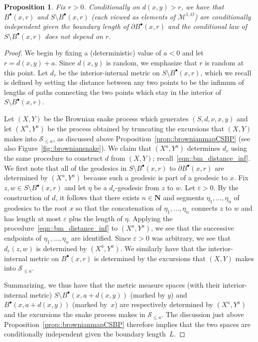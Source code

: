 \documentclass[10pt]{amsart}
\let\mathcal\mathscr
\newcommand{\sbullet}{{\scriptscriptstyle\bullet}}
\let\epsilon\varepsilon
\theoremstyle{plain}
\numberwithin{theorem}{section}
\newtheorem{proposition}[theorem]{Proposition}
\theoremstyle{definition}
\newcommand{\snake}{{\mathcal S}}
\newcommand\mmspace{{\mathcal M}}
\newcommand{\N}{\mathbf{N}}
\newcommand{\fb}[2]{B^\sbullet(#1,#2)}
\begin{document}
\begin{proposition}
\label{prop::metric_net_law}
Fix $r > 0$. Conditionally on $d(x,y) > r$, we have that $\fb{x}{r}$ and $S \setminus \fb{x}{r}$ (each viewed as elements of $\mmspace^{1,O}$) are conditionally independent given the boundary length of $\partial \fb{x}{r}$ and the conditional law of $S \setminus \fb{x}{r}$ does not depend on $r$.
\end{proposition}
\begin{proof}
We begin by fixing a (deterministic) value of $a < 0$ and let $r = d(x,y)+a$. Since $d(x,y)$ is random, we emphasize that $r$ is random at this point. Let $d_r$ be the interior-internal metric on $S \setminus \fb{x}{r}$, which we recall is defined by setting the distance between any two points to be the infimum of lengths of paths connecting the two points which stay in the interior of $S \setminus \fb{x}{r}$.

Let $(X,Y)$ be the Brownian snake process which generates $(S,d,\nu,x,y)$ and let $(X^a,Y^a)$ be the process obtained by truncating the excursions that $(X,Y)$ makes into $\snake_{\leq a}$, as discussed above Proposition~\ref{prop::brownianmapCSBP} (see also Figure~\ref{fig::browniansnake}). We claim that $(X^a,Y^a)$ determines $d_r$ using the same procedure to construct $d$ from $(X,Y)$; recall~\eqref{eqn::bm_distance_inf}. We first note that all of the geodesics in $S \setminus \fb{x}{r}$ to $\partial \fb{x}{r}$ are determined by $(X^a,Y^a)$ because such a geodesic is part of a geodesic to $x$. Fix $z, w \in S \setminus \fb{x}{r}$ and let $\eta$ be a $d_r$-geodesic from $z$ to $w$. Let $\epsilon > 0$. By the construction of $d$, it follows that there exists $n \in \N$ and segments $\eta_1,\ldots,\eta_n$ of geodesics to the root $x$ so that the concatenation of $\eta_1,\ldots,\eta_n$ connects $z$ to $w$ and has length at most $\epsilon$ plus the length of $\eta$. Applying the procedure~\eqref{eqn::bm_distance_inf} to $(X^a,Y^a)$, we see that the successive endpoints of $\eta_1,\ldots,\eta_n$ are identified. Since $\epsilon > 0$ was arbitrary, we see that $d_r(z,w)$ is determined by $(X^a,Y^a)$. We similarly have that the interior-internal metric on $\fb{x}{r}$ is determined by the excursions that $(X,Y)$ makes into $\snake_{\leq a}$.

Summarizing, we thus have that the metric measure spaces (with their interior-internal metric) $S \setminus \fb{x}{a+d(x,y)}$ (marked by $y$) and $\fb{x}{a+d(x,y)}$ (marked by~$x$) are respectively determined by $(X^a,Y^a)$ and the excursions the snake process makes in $\snake_{\leq a}$. The discussion just above Proposition~\ref{prop::brownianmapCSBP} therefore implies that the two spaces are conditionally independent given the boundary length~$L$.


\end{proof}
\end{document}
